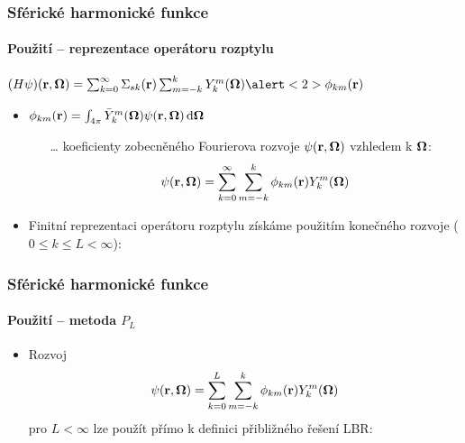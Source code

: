 \begin{frame}
  \frametitle{Sférické harmonické funkce}
  \framesubtitle{Použití -- reprezentace operátoru rozptylu}
  
  \centering \alert<1>{$(H\angflux)(\br,\bomega) = \suma[k]{0}{\infty}\Sigma_{sk}(\br)\suma[m]{-k}{k}\Y{k}{m}(\bomega)\alert<2>{\angmomgen{k}{m}(\br)}$}
  
  \begin{itemize}
  	\item<2-> \alert<2>{$\angmomgen{k}{m}(\br) = \aint{\Yc{k}{m}(\bomega)\angflux(\br,\bomega)}$}\vspace{.5em}
  	\begin{itemize}
  		\item[\ldots]	  koeficienty zobecněného Fourierova rozvoje $\angflux(\br,\bomega)$ vzhledem k $\bomega$:
  		  \vspace{-.5em}
    		  \begin{equation*}
    		    \angflux(\br,\bomega) = \suma[k]{0}{\infty}\suma[m]{-k}{k}\angmomgen{k}{m}(\br)\Y{k}{m}(\bomega)
    		  \end{equation*}
   	\end{itemize}
    \item<3-> Finitní reprezentaci operátoru rozptylu získáme použitím konečného rozvoje ($0 \leq k \leq L < \infty$):
  \end{itemize}

\end{frame}

\begin{frame}
  \frametitle{Sférické harmonické funkce}
  \framesubtitle{Použití -- metoda $P_L$}
  
  \begin{itemize}
  	\item  Rozvoj 
  	  \begin{equation*}
		    \angflux(\br,\bomega) = \suma[k]{0}{L}\suma[m]{-k}{k}\angmomgen{k}{m}(\br)\Y{k}{m}(\bomega)
		  \end{equation*}
		  pro $L < \infty$ lze použít přímo k definici přibližného řešení LBR:
  \end{itemize}
\end{frame}
